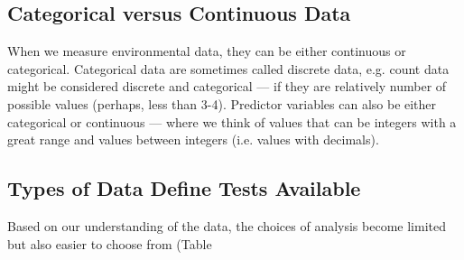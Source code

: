 \documentclass{article}\usepackage[]{graphicx}\usepackage[]{color}
\begin{document}
\subsection{Categorical versus Continuous Data}

When we measure environmental data, they can be either continuous or categorical. Categorical data are sometimes called discrete data, e.g. count data might be considered discrete and categorical --- if they are relatively number of possible values (perhaps, less than 3-4). Predictor variables can also be either categorical or continuous --- where we think of values that can be integers with a great range and values between integers (i.e. values with decimals).

\subsection{Types of Data Define Tests Available}

Based on our understanding of the data, the choices of analysis become limited but also easier to choose from (Table %
\end{document}
